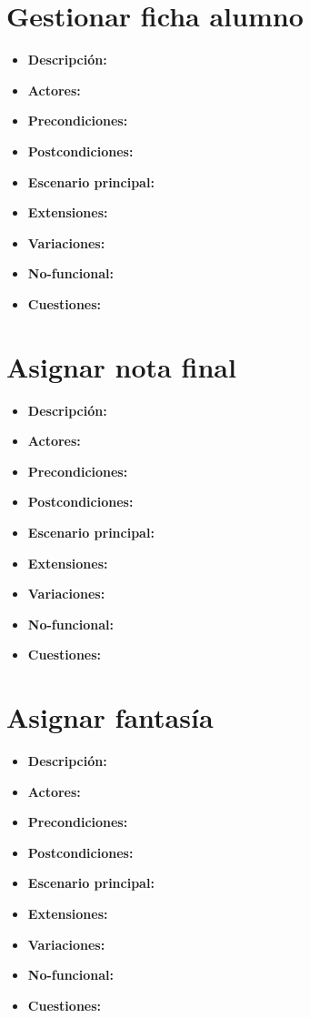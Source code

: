 \documentclass[12pt,letterpaper]{article}
\begin{document}
\section{Gestionar ficha alumno}
\begin{itemize}
	\item \textbf{Descripción:}
	\item \textbf{Actores:}
	\item \textbf{Precondiciones:}
	\item \textbf{Postcondiciones:}
	\item \textbf{Escenario principal:}
	\item \textbf{Extensiones:}
	\item \textbf{Variaciones:}
	\item \textbf{No-funcional:}
	\item \textbf{Cuestiones:}
\end{itemize}

\section{Asignar nota final}
\begin{itemize}
	\item \textbf{Descripción:}
	\item \textbf{Actores:}
	\item \textbf{Precondiciones:}
	\item \textbf{Postcondiciones:}
	\item \textbf{Escenario principal:}
	\item \textbf{Extensiones:}
	\item \textbf{Variaciones:}
	\item \textbf{No-funcional:}
	\item \textbf{Cuestiones:}
\end{itemize}

\section{Asignar fantasía}
\begin{itemize}
	\item \textbf{Descripción:}
	\item \textbf{Actores:}
	\item \textbf{Precondiciones:}
	\item \textbf{Postcondiciones:}
	\item \textbf{Escenario principal:}
	\item \textbf{Extensiones:}
	\item \textbf{Variaciones:}
	\item \textbf{No-funcional:}
	\item \textbf{Cuestiones:}
\end{itemize}
\end{document}
